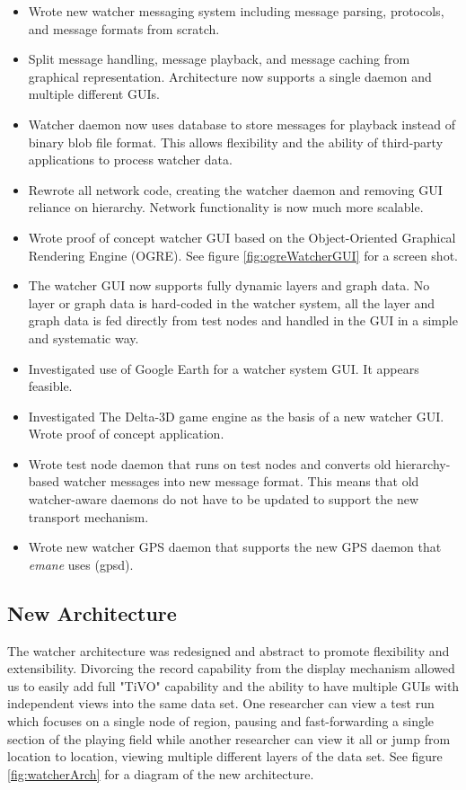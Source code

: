 \documentclass{report}
\begin{document}
\begin{itemize}
\item Wrote new watcher messaging system including message parsing, protocols, and message formats from scratch. 
\item Split message handling, message playback, and message caching from graphical representation. Architecture now
supports a single daemon and multiple different GUIs. 
\item Watcher daemon now uses database to store messages for playback instead of binary blob file format. This allows
flexibility and the ability of third-party applications to process watcher data. 
\item Rewrote all network code, creating the watcher daemon and removing GUI reliance on hierarchy. Network functionality is now
much more scalable. 
\item Wrote proof of concept watcher GUI based on the Object-Oriented Graphical Rendering Engine (OGRE). See figure \ref{fig:ogreWatcherGUI} for a 
screen shot. 
\item The watcher GUI now supports fully dynamic layers and graph data. No layer or graph data is hard-coded in the watcher system, all 
the layer and graph data is fed directly from test nodes and handled in the GUI in a simple and systematic way.
\item Investigated use of Google Earth for a watcher system GUI. It appears feasible. 
\item Investigated The Delta-3D game engine as the basis of a new watcher GUI. Wrote proof of concept application. 
\item Wrote test node daemon that runs on test nodes and converts old hierarchy-based watcher messages into new message format. 
This means that old watcher-aware daemons do not have to be updated to support the new transport mechanism.
\item Wrote new watcher GPS daemon that supports the new GPS daemon that {\it emane} uses (gpsd). 
\end{itemize}


\subsection{New Architecture}

The watcher architecture was redesigned and abstract to promote flexibility and extensibility. Divorcing the record 
capability from the display mechanism allowed us to easily add full "TiVO" capability and the ability to have multiple 
GUIs with independent views into the same data set. One researcher can view a test run which focuses on a single node of region, 
pausing and fast-forwarding a single section of the playing field while another researcher can view it all or jump from 
location to location, viewing multiple different layers of the data set. See figure \ref{fig:watcherArch} for a diagram 
of the new architecture.
\end{document}
